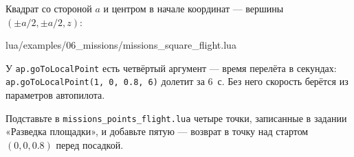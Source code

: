 Квадрат со стороной $a$ и центром в начале координат --- вершины $(\pm a/2, \pm a/2, z)$:

\begin{codefile}{lua/examples/06_missions/missions_square_flight.lua}
\end{codefile}

\begin{hintbox}
У \verb|ap.goToLocalPoint| есть четвёртый аргумент --- время перелёта в секундах: \verb|ap.goToLocalPoint(1, 0, 0.8, 6)| долетит за 6~с. Без него скорость берётся из параметров автопилота.
\end{hintbox}

\begin{taskbox}
Подставьте в \texttt{missions\_points\_flight.lua} четыре точки, записанные в задании «Разведка площадки», и добавьте пятую --- возврат в точку над стартом $(0, 0, 0.8)$ перед посадкой.
\end{taskbox}
